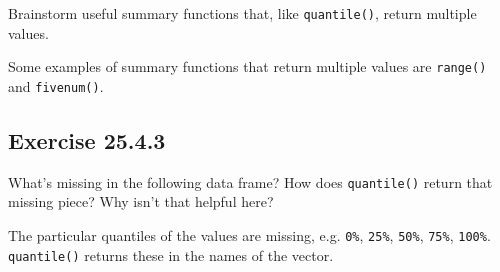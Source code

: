 \documentclass[]{book}
\newenvironment{Shaded}{\begin{snugshade}}{\end{snugshade}}
\newcommand{\CommentTok}[1]{\textcolor[rgb]{0.56,0.35,0.01}{\textit{#1}}}
\newcommand{\DataTypeTok}[1]{\textcolor[rgb]{0.13,0.29,0.53}{#1}}
\newcommand{\KeywordTok}[1]{\textcolor[rgb]{0.13,0.29,0.53}{\textbf{#1}}}
\newcommand{\NormalTok}[1]{#1}
\newcommand{\OperatorTok}[1]{\textcolor[rgb]{0.81,0.36,0.00}{\textbf{#1}}}
\newcommand{\StringTok}[1]{\textcolor[rgb]{0.31,0.60,0.02}{#1}}
\theoremstyle{plain}
\theoremstyle{remark}
\theoremstyle{definition}
\theoremstyle{definition}
\theoremstyle{definition}
\theoremstyle{remark}
\begin{document}
Brainstorm useful summary functions that, like \texttt{quantile()},
return multiple values.

Some examples of summary functions that return multiple values are
\texttt{range()} and \texttt{fivenum()}.

\begin{Shaded}
\end{Shaded}

\hypertarget{exercise-25.4.3}{%
\subsection*{\texorpdfstring{Exercise
{25.4.3}}{Exercise 25.4.3}}\label{exercise-25.4.3}}

What's missing in the following data frame? How does \texttt{quantile()}
return that missing piece? Why isn't that helpful here?

\begin{Shaded}
\end{Shaded}

The particular quantiles of the values are missing, e.g. \texttt{0\%},
\texttt{25\%}, \texttt{50\%}, \texttt{75\%}, \texttt{100\%}.
\texttt{quantile()} returns these in the names of the vector.

\begin{Shaded}
\end{Shaded}
\end{document}
